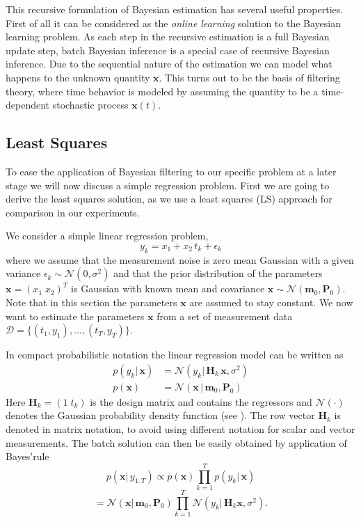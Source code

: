This recursive formulation of Bayesian estimation has several useful
properties. First of all it can be considered as the
\textit{online learning} solution to the Bayesian learning problem.
As each step in the recursive estimation is a full Bayesian update step,
batch Bayesian inference is a special case of recursive Bayesian
inference. Due to the sequential nature of the estimation we can model
what happens to the unknown quantity $\mathbf{x}$. This turns out
to be the basis of filtering theory, where time behavior is modeled
by assuming the quantity to be a time-dependent stochastic process
$\mathbf{x}(t)$.

\subsection{Least Squares}
To ease the application of Bayesian filtering to our specific problem
at a later stage we will now discuss a simple regression problem.
First we are going to derive the least squares solution, as
we use a least squares (LS) approach for comparison in our experiments.

We consider a simple linear regression problem,
\begin{equation}
  \label{regression_problem}
  y_k = x_1 + x_2 \, t_k + \epsilon_k
\end{equation}
where we assume that the measurement noise is zero mean Gaussian with
a given variance $\epsilon_k \sim \mathcal{N}(0, \sigma^2)$ and that the
prior distribution of the
parameters $\mathbf{x} = (x_{1} \; x_{2})^T$ is
Gaussian with known mean and covariance
$\mathbf{x} \sim \mathcal{N}(\mathbf{m}_0, \mathbf{P}_0)$. Note that
in this section the parameters $\mathbf{x}$ are assumed to stay constant.
We now want to estimate
the parameters $\mathbf{x}$ from a set of measurement
data $\mathcal{D} = \{(t_1, y_1),...,(t_T, y_T)\}$.

In compact probabilistic notation the linear regression model
can be written as
\begin{equation}
  \label{regression_model_1}
  \begin{aligned}
    p(y_k |\, \mathbf{x}) &= \mathcal{N}(y_k |\, \mathbf{H}_k \, \mathbf{x}, \sigma^2) \\
    p(\mathbf{x}) &= \mathcal{N}(\mathbf{x} \, |\,
    \mathbf{m}_0, \mathbf{P}_0)
  \end{aligned}
\end{equation}
Here $\mathbf{H}_k = (1 \;t_k)$ is the design matrix and
contains the regressors and $\mathcal{N}(\cdot)$ denotes
the Gaussian probability density
function (see ). The row vector $\mathbf{H}_k$ is denoted
in matrix notation, to avoid using different notation for scalar
and vector measurements.
The batch solution can then be easily obtained by application of Bayes'rule
$$ p(\mathbf{x} | \, y_{1:T})
\propto p(\mathbf{x}) \prod^T_{k=1} p (y_k | \, \mathbf{x}) $$
$$ = \mathcal{N}(\mathbf{x} | \, \mathbf{m}_0, \mathbf{P}_0)
\prod^T_{k=1} \mathcal{N}(y_k |\, \textbf{H}_k \mathbf{x}, \sigma^2). $$

